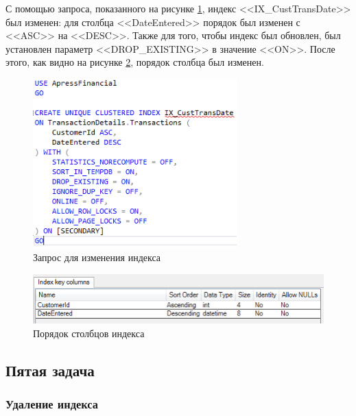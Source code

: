 \documentclass[a4paper, 14pt]{extarticle}
\begin{document}
С помощью запроса, показанного на рисунке \ref{fig:task-4-3}, индекс
<<\foreignlanguage{english}{IX\_CustTransDate}>> был изменен: для столбца
<<\foreignlanguage{english}{DateEntered}>> порядок был изменен с
<<\foreignlanguage{english}{ASC}>> на <<\foreignlanguage{english}{DESC}>>.
Также для того, чтобы индекс был обновлен, был установлен параметр
<<\foreignlanguage{english}{DROP\_EXISTING}>> в значение
<<\foreignlanguage{english}{ON}>>. После этого, как видно на рисунке
\ref{fig:task-4-4}, порядок столбца был изменен.

\begin{figure}[H]
  \centering
  \includegraphics[width=0.7\textwidth]{images/task-4/3.png}
  \caption{Запрос для изменения индекса}
  \label{fig:task-4-3}
\end{figure}

\begin{figure}[H]
  \centering
  \includegraphics[width=\textwidth]{images/task-4/4.png}
  \caption{Порядок столбцов индекса}
  \label{fig:task-4-4}
\end{figure}

\subsection{Пятая задача}

\subsubsection{Удаление индекса}
\end{document}
